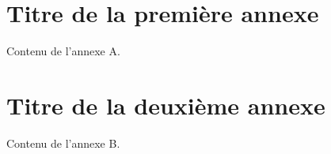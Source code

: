 \MyAppendix

\chapter{Titre de la première annexe}

Contenu de l’annexe A.












\chapter{Titre de la deuxième annexe}

Contenu de l’annexe B.
